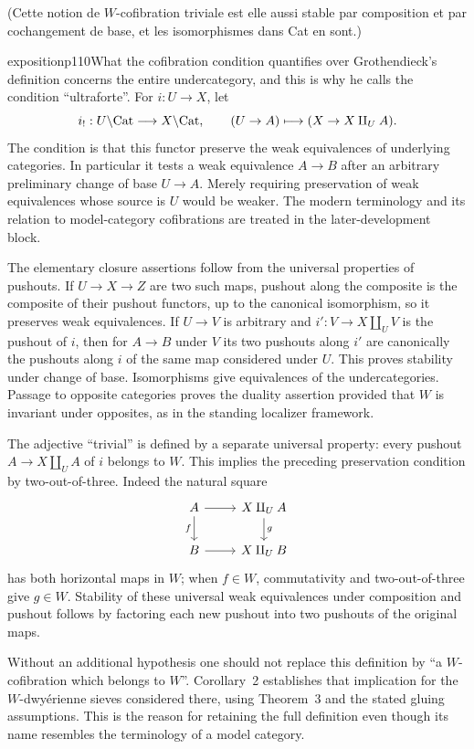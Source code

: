 (Cette notion de $W$-cofibration triviale est elle aussi stable par composition et par cochangement de base, et les isomorphismes dans Cat en sont.)


\begin{dcomment}{exposition}{p110}{What the cofibration condition quantifies over}
Grothendieck's definition concerns the entire undercategory, and this is why he calls the condition ``ultraforte''. For $i:U\to X$, let
\[
 i_!:U\backslash\mathrm{Cat}\longrightarrow X\backslash\mathrm{Cat},
 \qquad (U\to A)\longmapsto(X\to X\amalg_U A).
\]
The condition is that this functor preserve the weak equivalences of underlying categories. In particular it tests a weak equivalence $A\to B$ after an arbitrary preliminary change of base $U\to A$. Merely requiring preservation of weak equivalences whose source is $U$ would be weaker. The modern terminology and its relation to model-category cofibrations are treated in the later-development block.

The elementary closure assertions follow from the universal properties of pushouts. If $U\to X\to Z$ are two such maps, pushout along the composite is the composite of their pushout functors, up to the canonical isomorphism, so it preserves weak equivalences. If $U\to V$ is arbitrary and $i':V\to X\amalg_U V$ is the pushout of $i$, then for $A\to B$ under $V$ its two pushouts along $i'$ are canonically the pushouts along $i$ of the same map considered under $U$. This proves stability under change of base. Isomorphisms give equivalences of the undercategories. Passage to opposite categories proves the duality assertion provided that $W$ is invariant under opposites, as in the standing localizer framework.

The adjective ``trivial'' is defined by a separate universal property: every pushout $A\to X\amalg_U A$ of $i$ belongs to $W$. This implies the preceding preservation condition by two-out-of-three. Indeed the natural square
\[
\begin{tikzcd}
A\arrow[r]\arrow[d,"f"']&X\amalg_U A\arrow[d,"g"]\\
B\arrow[r]&X\amalg_U B
\end{tikzcd}
\]
has both horizontal maps in $W$; when $f\in W$, commutativity and two-out-of-three give $g\in W$. Stability of these universal weak equivalences under composition and pushout follows by factoring each new pushout into two pushouts of the original maps.

Without an additional hypothesis one should not replace this definition by ``a $W$-cofibration which belongs to $W$''. Corollary~2 establishes that implication for the $W$-dwyérienne sieves considered there, using Theorem~3 and the stated gluing assumptions. This is the reason for retaining the full definition even though its name resembles the terminology of a model category.
\end{dcomment}


